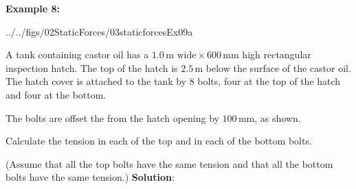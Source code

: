 \documentclass[10pt,onesided]{amsart}
\begin{document}
\newpage
\begin{minipage}[c]{0.45\textwidth}
	\textbf{Example 8:}
	\parb
	\raggedright
	
	\begin{cfig}[0.65]{../../figs/02StaticForces/03staticforcesEx09a}\end{cfig}
	A tank containing castor oil has a $1.0\,\text{m wide}\times 600 \,\text{mm}$ high rectangular inspection hatch.\parb
	The top of the hatch is $2.5\,\text{m}$ below the surface of the castor oil. The hatch cover is attached to
	the tank by $8$ bolts, four at the top of the hatch and four at the bottom.\par\bigskip
	The bolts are offset the from the hatch opening by 	$100\,\text{mm}$, as shown.\par\bigskip
	Calculate the tension in each of the top and in each of the bottom bolts.\par\bigskip
	(Assume that all the top bolts have the same tension and that all the bottom bolts have the same tension.)
	\parb
	\textbf{Solution}:
\end{minipage}
\hfill
\end{document}
